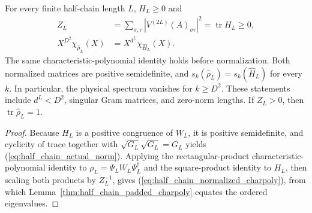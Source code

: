 \begin{lemma}%
    \label{thm:half_chain_positive_comparison}
    \leanok
    For every finite half-chain length $L$, $H_L\geq0$ and
    \begin{align}
        Z_L & = \sum_{\sigma,\tau}
        |V^{(2L)}(A)_{\sigma\tau}|^2
        =\operatorname{tr}H_L\geq0,
        \label{eq:half_chain_actual_norm}     \\
        X^{D^2}\chi_{\widehat\rho_L}(X)
            & =X^{d^L}\chi_{\widehat H_L}(X).
        \label{eq:half_chain_normalized_charpoly}
    \end{align}
    The same characteristic-polynomial identity holds before normalization.
    Both normalized matrices are positive semidefinite, and
    $s_k(\widehat\rho_L)=s_k(\widehat H_L)$ for every $k$.
    In particular, the physical spectrum vanishes for $k\geq D^2$.
    These statements include $d^L<D^2$, singular Gram matrices, and
    zero-norm lengths. If $Z_L>0$, then
    $\operatorname{tr}\widehat\rho_L=1$.
\end{lemma}

\begin{proof}
    \leanok
    Because $H_L$ is a positive congruence of $W_L$, it is positive
    semidefinite, and cyclicity of trace together with $\sqrt{G_L}\sqrt{G_L}=G_L$
    yields (\ref{eq:half_chain_actual_norm}). Applying the rectangular-product
    characteristic-polynomial identity to $\rho_L=\Psi_L W_L\Psi_L^\dagger$ and
    the square-product identity to $H_L$, then scaling both products by
    $Z_L^{-1}$, gives (\ref{eq:half_chain_normalized_charpoly}), from which
    Lemma~\ref{thm:half_chain_padded_charpoly} equates the ordered
    eigenvalues.
\end{proof}

